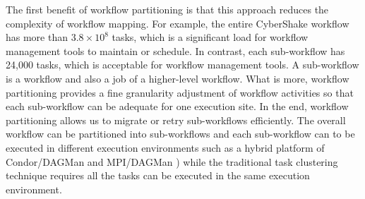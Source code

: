 The first benefit of workflow partitioning is that this approach reduces the complexity of workflow mapping. For example, the entire CyberShake workflow has more than $3.8\times 10^8$ tasks, which is a significant load for workflow management tools to maintain or schedule. In contrast, each sub-workflow has 24,000 tasks, which is acceptable for workflow management tools. A sub-workflow is a workflow and also a job of a higher-level workflow. What is more, workflow partitioning provides a fine granularity adjustment of workflow activities so that each sub-workflow can be adequate for one execution site. In the end, workflow partitioning allows us to migrate or retry sub-workflows efficiently. The overall workflow can be partitioned into sub-workflows and each sub-workflow can to be executed in different execution environments such as a hybrid platform of Condor/DAGMan \cite{DAGMan} and MPI/DAGMan \cite{Rynge2012}) while the traditional task clustering technique requires all the tasks can be executed in the same execution environment. 



 


